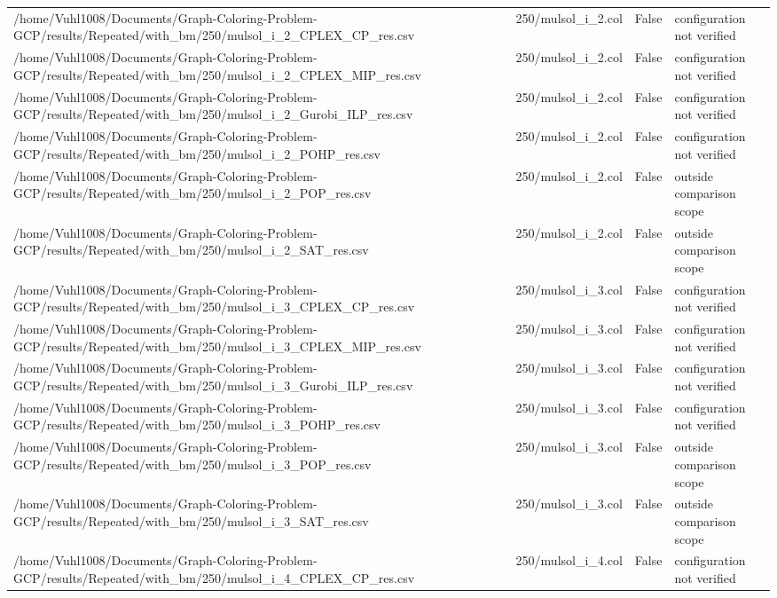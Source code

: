 \begin{table}[htbp]
\begin{tabular}{llll}
/home/Vuhl1008/Documents/Graph-Coloring-Problem-GCP/results/Repeated/with\_bm/250/mulsol\_i\_2\_CPLEX\_CP\_res.csv & 250/mulsol\_i\_2.col & False & configuration not verified \\
/home/Vuhl1008/Documents/Graph-Coloring-Problem-GCP/results/Repeated/with\_bm/250/mulsol\_i\_2\_CPLEX\_MIP\_res.csv & 250/mulsol\_i\_2.col & False & configuration not verified \\
/home/Vuhl1008/Documents/Graph-Coloring-Problem-GCP/results/Repeated/with\_bm/250/mulsol\_i\_2\_Gurobi\_ILP\_res.csv & 250/mulsol\_i\_2.col & False & configuration not verified \\
/home/Vuhl1008/Documents/Graph-Coloring-Problem-GCP/results/Repeated/with\_bm/250/mulsol\_i\_2\_POHP\_res.csv & 250/mulsol\_i\_2.col & False & configuration not verified \\
/home/Vuhl1008/Documents/Graph-Coloring-Problem-GCP/results/Repeated/with\_bm/250/mulsol\_i\_2\_POP\_res.csv & 250/mulsol\_i\_2.col & False & outside comparison scope \\
/home/Vuhl1008/Documents/Graph-Coloring-Problem-GCP/results/Repeated/with\_bm/250/mulsol\_i\_2\_SAT\_res.csv & 250/mulsol\_i\_2.col & False & outside comparison scope \\
/home/Vuhl1008/Documents/Graph-Coloring-Problem-GCP/results/Repeated/with\_bm/250/mulsol\_i\_3\_CPLEX\_CP\_res.csv & 250/mulsol\_i\_3.col & False & configuration not verified \\
/home/Vuhl1008/Documents/Graph-Coloring-Problem-GCP/results/Repeated/with\_bm/250/mulsol\_i\_3\_CPLEX\_MIP\_res.csv & 250/mulsol\_i\_3.col & False & configuration not verified \\
/home/Vuhl1008/Documents/Graph-Coloring-Problem-GCP/results/Repeated/with\_bm/250/mulsol\_i\_3\_Gurobi\_ILP\_res.csv & 250/mulsol\_i\_3.col & False & configuration not verified \\
/home/Vuhl1008/Documents/Graph-Coloring-Problem-GCP/results/Repeated/with\_bm/250/mulsol\_i\_3\_POHP\_res.csv & 250/mulsol\_i\_3.col & False & configuration not verified \\
/home/Vuhl1008/Documents/Graph-Coloring-Problem-GCP/results/Repeated/with\_bm/250/mulsol\_i\_3\_POP\_res.csv & 250/mulsol\_i\_3.col & False & outside comparison scope \\
/home/Vuhl1008/Documents/Graph-Coloring-Problem-GCP/results/Repeated/with\_bm/250/mulsol\_i\_3\_SAT\_res.csv & 250/mulsol\_i\_3.col & False & outside comparison scope \\
/home/Vuhl1008/Documents/Graph-Coloring-Problem-GCP/results/Repeated/with\_bm/250/mulsol\_i\_4\_CPLEX\_CP\_res.csv & 250/mulsol\_i\_4.col & False & configuration not verified \\

\end{tabular}
\end{table}
